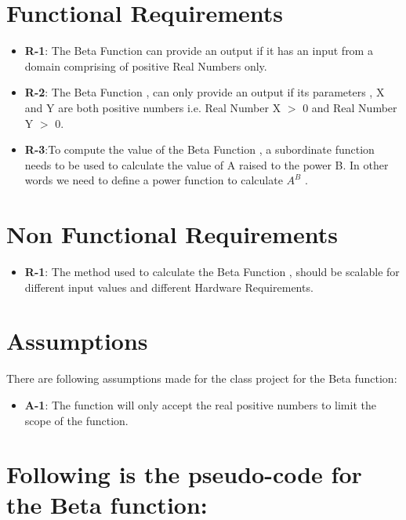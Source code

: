 \documentclass[10pt]{article}
\begin{document}
\section*{Functional Requirements}


\begin{itemize}
    \item \textbf{R-1}: The Beta Function can provide an output if it has an input from a domain comprising of positive Real Numbers only.
    \item \textbf{R-2}:  The Beta Function , can only provide an output if its parameters , X and Y are both positive numbers i.e. Real Number X $>$ 0 and Real Number Y $>$ 0.
    \item \textbf{R-3}:To compute the value of the Beta Function , a subordinate function needs to be used to calculate the value of A raised to the power B. In other words we need to define a power function to calculate $A^B$ .
\end{itemize}


\section*{Non Functional Requirements}

\begin{itemize}
    \item \textbf{R-1}: The method used to calculate the Beta Function , should be scalable for different input values and different Hardware Requirements.
    
\end{itemize}





\section*{Assumptions}
There are following assumptions made for the class project for the Beta function:
\begin{itemize}
    \item \textbf{A-1}: The function will only accept the real positive numbers to limit the scope of the function.
    
\end{itemize}


\section*{Following is the pseudo-code for the Beta function:}
\end{document}
